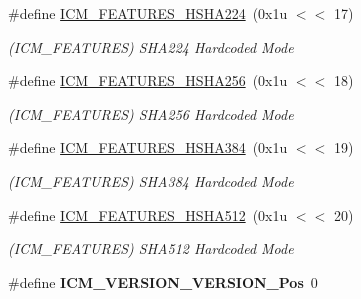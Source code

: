 \begin{DoxyCompactItemize}
\mbox{\label{group__SAMV71__ICM_gaff1e48bad7ec2c1fd8b6d37d8250c57a}} 
\#define \mbox{\hyperlink{group__SAMV71__ICM_gaff1e48bad7ec2c1fd8b6d37d8250c57a}{I\+C\+M\+\_\+\+F\+E\+A\+T\+U\+R\+E\+S\+\_\+\+H\+S\+H\+A224}}~(0x1u $<$$<$ 17)
\begin{DoxyCompactList}\small\item\em (I\+C\+M\+\_\+\+F\+E\+A\+T\+U\+R\+ES) S\+H\+A224 Hardcoded Mode \end{DoxyCompactList}\item 
\mbox{\label{group__SAMV71__ICM_ga6a1e15bd2c0dd22ea980563c58b04f29}} 
\#define \mbox{\hyperlink{group__SAMV71__ICM_ga6a1e15bd2c0dd22ea980563c58b04f29}{I\+C\+M\+\_\+\+F\+E\+A\+T\+U\+R\+E\+S\+\_\+\+H\+S\+H\+A256}}~(0x1u $<$$<$ 18)
\begin{DoxyCompactList}\small\item\em (I\+C\+M\+\_\+\+F\+E\+A\+T\+U\+R\+ES) S\+H\+A256 Hardcoded Mode \end{DoxyCompactList}\item 
\mbox{\label{group__SAMV71__ICM_gac45a4b331645660d29a3cec6702b893e}} 
\#define \mbox{\hyperlink{group__SAMV71__ICM_gac45a4b331645660d29a3cec6702b893e}{I\+C\+M\+\_\+\+F\+E\+A\+T\+U\+R\+E\+S\+\_\+\+H\+S\+H\+A384}}~(0x1u $<$$<$ 19)
\begin{DoxyCompactList}\small\item\em (I\+C\+M\+\_\+\+F\+E\+A\+T\+U\+R\+ES) S\+H\+A384 Hardcoded Mode \end{DoxyCompactList}\item 
\mbox{\label{group__SAMV71__ICM_ga594c3c5b43b7bad79740c322351d825a}} 
\#define \mbox{\hyperlink{group__SAMV71__ICM_ga594c3c5b43b7bad79740c322351d825a}{I\+C\+M\+\_\+\+F\+E\+A\+T\+U\+R\+E\+S\+\_\+\+H\+S\+H\+A512}}~(0x1u $<$$<$ 20)
\begin{DoxyCompactList}\small\item\em (I\+C\+M\+\_\+\+F\+E\+A\+T\+U\+R\+ES) S\+H\+A512 Hardcoded Mode \end{DoxyCompactList}\item 
\mbox{\label{group__SAMV71__ICM_gaf941e2c13ea7ac7a2466b8501ee8f13e}} 
\#define {\bfseries I\+C\+M\+\_\+\+V\+E\+R\+S\+I\+O\+N\+\_\+\+V\+E\+R\+S\+I\+O\+N\+\_\+\+Pos}~0
\item 

\end{DoxyCompactItemize}
